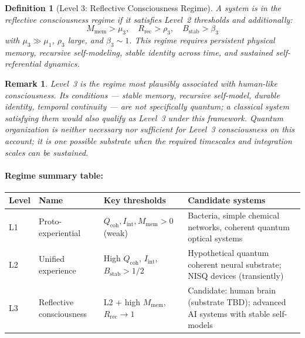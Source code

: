 \documentclass[12pt,letterpaper]{article}
\newtheorem{definition}{Definition}[section]
\newtheorem{remark}{Remark}[section]
\newcommand{\Qcoh}{Q_{\mathrm{coh}}}
\newcommand{\Iint}{I_{\mathrm{int}}}
\newcommand{\Mmem}{M_{\mathrm{mem}}}
\newcommand{\Bstab}{B_{\mathrm{stab}}}
\newcommand{\Rrec}{R_{\mathrm{rec}}}
\begin{document}
\begin{definition}[Level 3: Reflective Consciousness Regime]
\label{def:level3}
A system is in the \emph{reflective consciousness regime} if it satisfies
Level~2 thresholds and additionally:
\begin{equation}
  \Mmem > \mu_3, \quad \Rrec > \rho_3, \quad \Bstab > \beta_3
  \label{eq:level3_thresholds}
\end{equation}
with $\mu_3 \gg \mu_1$, $\rho_3$ large, and $\beta_3 \sim 1$.
This regime requires persistent physical memory, recursive self-modeling,
stable identity across time, and sustained self-referential dynamics.
\end{definition}

\begin{remark}
Level~3 is the regime most plausibly associated with human-like
consciousness. Its conditions --- stable memory, recursive self-model,
durable identity, temporal continuity --- are not specifically quantum;
a classical system satisfying them would also qualify as Level~3 under
this framework. Quantum organization is neither necessary nor sufficient for
Level~3 consciousness on this account; it is one possible substrate when the
required timescales and integration scales can be sustained.
\end{remark}

\paragraph{Regime summary table:}
\begin{center}
\begin{tabular}{p{1.3cm} p{2.5cm} p{3.2cm} p{4.5cm}}
\toprule
\textbf{Level} & \textbf{Name} & \textbf{Key thresholds} & \textbf{Candidate systems} \\
\midrule
L1 & Proto-experiential &
  $\Qcoh, \Iint, \Mmem > 0$ (weak) &
  Bacteria, simple chemical networks, coherent quantum optical systems \\
\addlinespace
L2 & Unified experience &
  High $\Qcoh$, $\Iint$, $\Bstab > 1/2$ &
  Hypothetical quantum coherent neural substrate; NISQ devices (transiently) \\
\addlinespace
L3 & Reflective consciousness &
  L2 + high $\Mmem$, $\Rrec \to 1$ &
  Candidate: human brain (substrate TBD); advanced AI systems with stable self-models \\
\bottomrule
\end{tabular}
\end{center}
\end{document}
